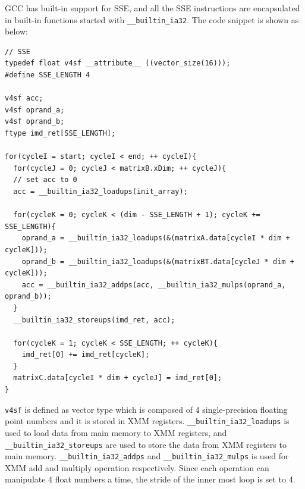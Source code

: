 \documentclass[12pt]{article}
\begin{document}
GCC has built-in support for SSE, and all the SSE instructions
are encapsulated in built-in functions started with 
\texttt{\_\_builtin\_ia32}. The code snippet is shown as below:

\begin{verbatim}
// SSE
typedef float v4sf __attribute__ ((vector_size(16)));
#define SSE_LENGTH 4

v4sf acc;
v4sf oprand_a;
v4sf oprand_b;
ftype imd_ret[SSE_LENGTH];

for(cycleI = start; cycleI < end; ++ cycleI){
  for(cycleJ = 0; cycleJ < matrixB.xDim; ++ cycleJ){
  // set acc to 0
  acc = __builtin_ia32_loadups(init_array);
        
  for(cycleK = 0; cycleK < (dim - SSE_LENGTH + 1); cycleK += SSE_LENGTH){
    oprand_a = __builtin_ia32_loadups(&(matrixA.data[cycleI * dim + cycleK]));
    oprand_b = __builtin_ia32_loadups(&(matrixBT.data[cycleJ * dim + cycleK]));
    acc = __builtin_ia32_addps(acc, __builtin_ia32_mulps(oprand_a, oprand_b));
  }
  __builtin_ia32_storeups(imd_ret, acc);

  for(cycleK = 1; cycleK < SSE_LENGTH; ++ cycleK){
    imd_ret[0] += imd_ret[cycleK];
  }
  matrixC.data[cycleI * dim + cycleJ] = imd_ret[0];
}
\end{verbatim}

\texttt{v4sf} is defined as vector type which is composed of 4 single-precision
floating point numbers and it is stored in XMM registers. 
\texttt{\_\_builtin\_ia32\_loadups} is used to load data from main memory to 
XMM registers, and \texttt{\_\_builtin\_ia32\_storeups} are used to store the 
data from XMM registers to main memory. \texttt{\_\_builtin\_ia32\_addps} and 
\texttt{\_\_builtin\_ia32\_mulps} is used for XMM add and multiply operation 
respectively. Since each operation can manipulate 4 float numbers a time, the 
stride of the inner most loop is set to 4.
\end{document}
